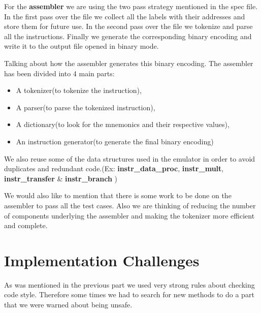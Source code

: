 \documentclass[11pt]{article}
\begin{document}
For the \textbf{assembler} we are using the two pass strategy mentioned in the spec
file. In the first pass over the file we collect all the labels with their
addresses and store them for future use. In the second pass over the file
we tokenize and parse all the instructions. Finally we generate the
corresponding binary encoding and write it to the output file opened in
binary mode.

Talking about how the assembler generates this binary encoding. The assembler
has been divided into 4 main parts:
\begin{itemize}
\item A tokenizer(to tokenize the instruction),
\item A parser(to parse the tokenized instruction),
\item A dictionary(to look for the mnemonics and their respective values),
\item An instruction generator(to generate the final binary encoding)
\end{itemize}

We also reuse some of the data structures used in the emulator in order to
avoid duplicates and redundant code.(Ex:
\textbf{instr\_data\_proc}, \textbf{instr\_mult}, \textbf{instr\_transfer} \& \textbf{instr\_branch}
)

We would also like to mention that there is some work to be done on the
assembler to pass all the test cases. Also we are thinking of reducing the
number of components underlying the assembler and making the tokenizer more
efficient and complete.

\section{Implementation Challenges}

As was mentioned in the previous part we used very strong rules about checking
code style. Therefore some times we had to search for new methods to do a part
that we were warned about being unsafe.
\end{document}
